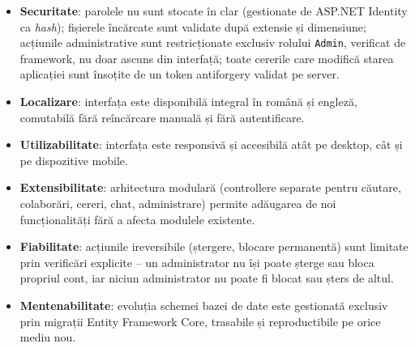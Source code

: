 \begin{itemize}
    \item \textbf{Securitate}: parolele nu sunt stocate în clar (gestionate de
    ASP.NET Identity ca \emph{hash}); fișierele încărcate sunt validate după
    extensie și dimensiune; acțiunile administrative sunt restricționate exclusiv
    rolului \texttt{Admin}, verificat de framework, nu doar ascuns din interfață;
    toate cererile care modifică starea aplicației sunt însoțite de un token
    antiforgery validat pe server.
    \item \textbf{Localizare}: interfața este disponibilă integral în română și
    engleză, comutabilă fără reîncărcare manuală și fără autentificare.
    \item \textbf{Utilizabilitate}: interfața este responsivă și accesibilă atât
    pe desktop, cât și pe dispozitive mobile.
    \item \textbf{Extensibilitate}: arhitectura modulară (controllere separate
    pentru căutare, colaborări, cereri, chat, administrare) permite adăugarea de
    noi funcționalități fără a afecta modulele existente.
    \item \textbf{Fiabilitate}: acțiunile ireversibile (ștergere, blocare
    permanentă) sunt limitate prin verificări explicite -- un administrator nu
    își poate șterge sau bloca propriul cont, iar niciun administrator nu poate
    fi blocat sau șters de altul.
    \item \textbf{Mentenabilitate}: evoluția schemei bazei de date este gestionată
    exclusiv prin migrații Entity Framework Core, trasabile și reproductibile pe
    orice mediu nou.
\end{itemize}
